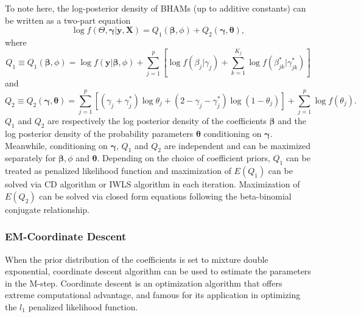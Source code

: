 \documentclass[AMA,STIX1COL,]{WileyNJD-v2}
\begin{document}
To note here, the log-posterior density of BHAMs (up to additive
constants) can be written as a two-part equation
\[ \log f(\Theta, \boldsymbol{\gamma}| \textbf{y}, \textbf{X}) = Q_1(\boldsymbol{\beta}, \phi) + Q_2 (\boldsymbol{\gamma},\boldsymbol{\theta}),\]
where
\[ Q_1\equiv Q_1(\boldsymbol{\beta}, \phi) = \log f(\textbf{y}|\boldsymbol{\beta}, \phi) + \sum\limits_{j=1}^p\left[\log f(\beta_j|\gamma_j)+\sum\limits_{k=1}^{K_j} \log f(\beta^{*}_{jk}|\gamma^{*}_{jk})\right]\]
and
\[Q_2 \equiv Q_2(\boldsymbol{\gamma},\boldsymbol{\theta}) = \sum\limits_{j=1}^{p} \left[ (\gamma_j+\gamma_{j}^{*})\log \theta_j + (2-\gamma_j-\gamma_{j}^{*}) \log (1-\theta_j)\right] +  \sum\limits_{j=1}^{p}\log f(\theta_j).\]
\(Q_1\) and \(Q_2\) are respectively the log posterior density of the
coefficients \(\boldsymbol{\beta}\) and the log posterior density of the
probability parameters \(\boldsymbol{\theta}\) conditioning on
\(\boldsymbol{\gamma}\). Meanwhile, conditioning on
\(\boldsymbol{\gamma}\), \(Q_1\) and \(Q_2\) are independent and can be
maximized separately for \(\boldsymbol{\beta}, \phi\) and
\(\boldsymbol{\theta}\). Depending on the choice of coefficient priors,
\(Q_1\) can be treated as penalized likelihood function and maximization
of \(E(Q_1)\) can be solved via CD algorithm or IWLS algorithm in each
iteration. Maximization of \(E(Q_2)\) can be solved via closed form
equations following the beta-binomial conjugate relationship.

\hypertarget{em-coordinate-descent}{%
\subsubsection{EM-Coordinate Descent}\label{em-coordinate-descent}}

\label{sec:EMCD}

When the prior distribution of the coefficients is set to mixture double
exponential, coordinate descent algorithm can be used to estimate the
parameters in the M-step. Coordinate descent is an optimization
algorithm that offers extreme computational advantage, and famous for
its application in optimizing the \(l_1\) penalized likelihood function.
\end{document}
